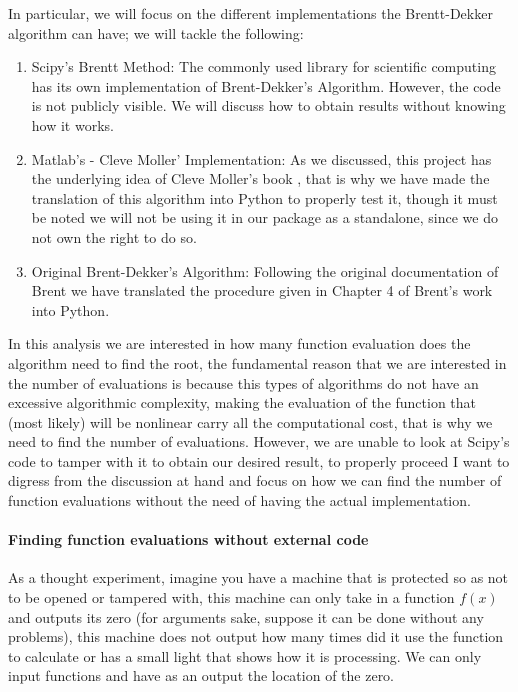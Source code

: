 In particular, we will focus on the different implementations the Brentt-Dekker algorithm can have; we will tackle the following:
\begin{enumerate}
    \item Scipy's Brentt Method: The commonly used library for scientific computing has its own implementation of Brent-Dekker's Algorithm. However, the code is not publicly visible. We will discuss how to obtain results without knowing how it works.
    \item Matlab's - Cleve Moller' Implementation: As we discussed, this project has the underlying idea of Cleve Moller's book \cite{doi:10.1137/1.9780898717952}, that is why we have made the translation of this algorithm into Python to properly test it, though it must be noted we will not be using it in our package as a standalone, since we do not own the right to do so.
    \item Original Brent-Dekker's Algorithm: Following the original documentation of Brent \cite{brent2002algorithms} we have translated the procedure given in Chapter 4 of Brent's work into Python.
\end{enumerate}

In this analysis we are interested in how many function evaluation does the algorithm need to find the root, the fundamental reason that we are interested in the number of evaluations is because this types of algorithms do not have an excessive algorithmic complexity, making the evaluation of the function that (most likely) will be nonlinear carry all the computational cost, that is why we need to find the number of evaluations. However, we are unable to look at Scipy's code to tamper with it to obtain our desired result, to properly proceed I want to digress from the discussion at hand and focus on how we can find the number of function evaluations without the need of having the actual implementation.

\paragraph{Finding function evaluations without external code} As a thought experiment, imagine you have a machine that is protected so as not to be opened or tampered with, this machine can only take in a function $f(x)$ and outputs its zero (for arguments sake, suppose it can be done without any problems), this machine does not output how many times did it use the function to calculate or has a small light that shows how it is processing. We can only input functions and have as an output the location of the zero. 




